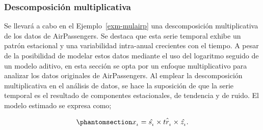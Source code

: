 \documentclass[
  us-letterpaper,
]{scrreprt}
\theoremstyle{plain}
\theoremstyle{definition}
\theoremstyle{definition}
\theoremstyle{plain}
\theoremstyle{remark}
\begin{document}
\subsubsection{Descomposición
multiplicativa}\label{descomposiciuxf3n-multiplicativa}

Se llevará a cabo en el Ejemplo~\ref{exm-mulairp} una descomposición
multiplicativa de los datos de AirPassengers. Se destaca que esta serie
temporal exhibe un patrón estacional y una variabilidad intra-anual
crecientes con el tiempo. A pesar de la posibilidad de modelar estos
datos mediante el uso del logaritmo seguido de un modelo aditivo, en
esta sección se opta por un enfoque multiplicativo para analizar los
datos originales de AirPassengers. Al emplear la descomposición
multiplicativa en el análisis de datos, se hace la suposición de que la
serie temporal es el resultado de componentes estacionales, de tendencia
y de ruido. El modelo estimado se expresa como;

\begin{equation}\phantomsection\label{eq-muldecom}{
x_{_t}=\hat{s_{_t}}\times \hat{tr_{_t}}\times \hat{z_{_t}}.
}\end{equation}
\end{document}
